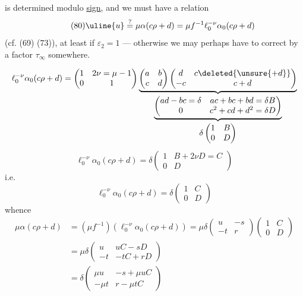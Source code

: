 
is determined modulo \uline{sign}, and 
we must have a relation
\[
\tag{80}
\uline{u}\overset{?}{=}\mu\alpha(c\rho+d)
=\mu f^{-1}\ell_0^{-\nu}\alpha_0(c\rho+d)
\]
(cf. (69) (73)), at least if $\varepsilon_2=1$ ---
otherwise we may perhaps have to correct by a factor $\tau_\infty$ somewhere.


\[
\ell_0^{-\nu}\alpha_0(c\rho+d)
=
\begin{pmatrix}1&2\nu=\mu-1\\0&1\end{pmatrix}
\underbrace{
\begin{pmatrix}a&b\\c&d\end{pmatrix}
\begin{pmatrix}d&c\deleted{\unsure{+d}}\\-c&c+d\end{pmatrix}
}_{\displaystyle
\underbrace{
\begin{pmatrix}
ad-bc=\delta&ac+bc+bd=\delta B\\
0&c^2+cd+d^2=\delta D
\end{pmatrix}
}_{\displaystyle\delta\begin{pmatrix}1&B\\0&D\end{pmatrix}}
}
\]
\[
\ell_0^{-\nu}\alpha_0(c\rho+d)
=\delta\begin{pmatrix}1&B+2\nu D=C\\0&D\end{pmatrix}
\]
i.e.
\[
\tag{81}
\ell_0^{-\nu}\alpha_0(c\rho+d)
=\delta\begin{pmatrix}1&C\\0&D\end{pmatrix}
\]
whence
\[
\begin{aligned}
\mu\alpha(c\rho+d)
&=(\mu f^{-1})(\ell_0^{-\nu}\alpha_0(c\rho+d))
=\mu\delta\begin{pmatrix}u&-s\\-t&r\end{pmatrix}
\begin{pmatrix}1&C\\0&D\end{pmatrix}\\
&=\mu\delta\begin{pmatrix}u&uC-sD\\-t&-tC+rD\end{pmatrix}\\
&=\delta\begin{pmatrix}\mu u&-s+\mu uC\\-\mu t&r-\mu tC\end{pmatrix}
\end{aligned}
\]
